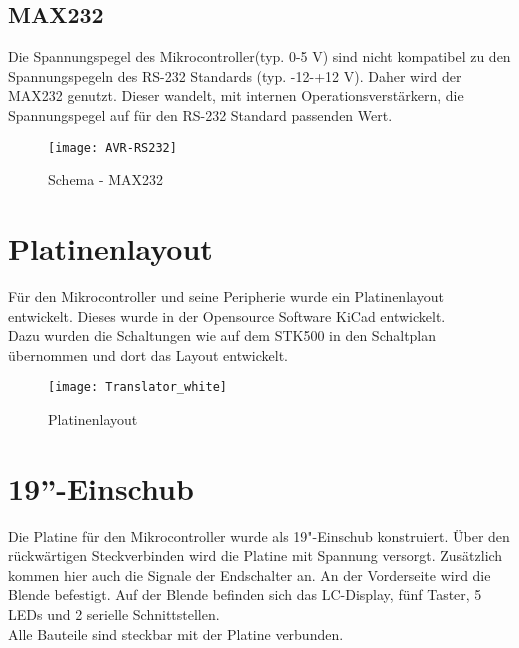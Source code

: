 \subsection{MAX232}
Die Spannungspegel des Mikrocontroller(typ. 0-5 V) sind nicht kompatibel zu den Spannungspegeln des RS-232 Standards (typ. -12-+12 V). Daher wird der  MAX232 genutzt. Dieser wandelt, mit internen Operationsverstärkern, die Spannungspegel auf für den RS-232 Standard passenden Wert.
\begin{figure}[htb]
\centering
\texttt{[image: AVR-RS232]}
\caption{Schema - MAX232}
\label{fig:MAX232}
\citep{uC:RS232}
\end{figure}

\section{Platinenlayout}
Für den Mikrocontroller und seine Peripherie wurde ein Platinenlayout entwickelt. Dieses wurde in der Opensource Software KiCad entwickelt. \\ 
Dazu wurden die Schaltungen wie auf dem STK500 in den Schaltplan übernommen und dort das Layout entwickelt. 
\begin{figure}[htb]
\centering
\texttt{[image: Translator\_white]}
\caption{Platinenlayout}
\label{fig:Platine}
\end{figure}
\section{19''-Einschub}
Die Platine für den Mikrocontroller wurde als 19"-Einschub konstruiert. Über den rückwärtigen Steckverbinden wird die Platine mit Spannung versorgt. Zusätzlich kommen hier auch die Signale der Endschalter an.
An der Vorderseite wird die Blende befestigt. Auf der Blende befinden sich das LC-Display, fünf Taster, 5 LEDs und 2 serielle Schnittstellen.\\ Alle Bauteile sind steckbar mit der Platine verbunden.